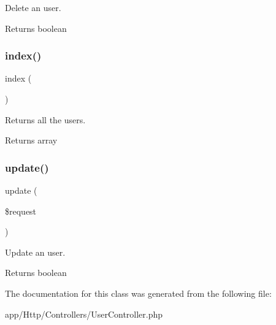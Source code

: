 Delete an user.

\begin{DoxyReturn}{Returns}
boolean 
\end{DoxyReturn}
\mbox{\label{class_app_1_1_http_1_1_controllers_1_1_user_controller_a149eb92716c1084a935e04a8d95f7347}} 
\subsubsection{\texorpdfstring{index()}{index()}}
{\footnotesize\ttfamily index (\begin{DoxyParamCaption}{ }\end{DoxyParamCaption})}

Returns all the users.

\begin{DoxyReturn}{Returns}
array 
\end{DoxyReturn}
\mbox{\label{class_app_1_1_http_1_1_controllers_1_1_user_controller_ab7b27a90191560dcef32126b0945db0d}} 
\subsubsection{\texorpdfstring{update()}{update()}}
{\footnotesize\ttfamily update (\begin{DoxyParamCaption}\item[{}]{\$request }\end{DoxyParamCaption})}

Update an user.

\begin{DoxyReturn}{Returns}
boolean 
\end{DoxyReturn}


The documentation for this class was generated from the following file\+:\begin{DoxyCompactItemize}
\item 
app/\+Http/\+Controllers/User\+Controller.\+php\end{DoxyCompactItemize}
